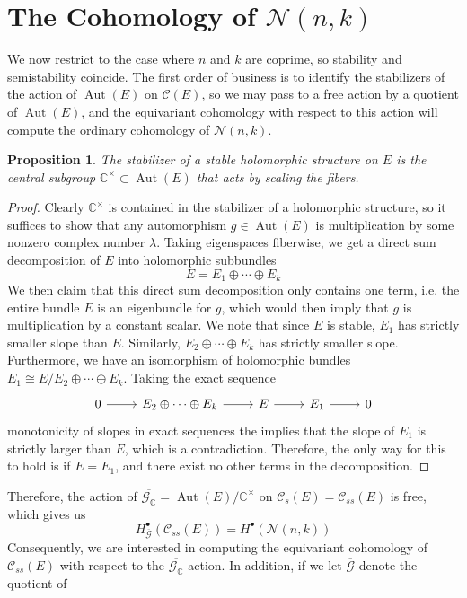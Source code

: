 \documentclass[psamsfonts, 12pt]{amsart}
\newtheorem{prop}[thm]{Proposition}
\theoremstyle{definition}
\theoremstyle{remark}
\newcommand{\C}{\mathbb{C}}
\DeclareMathOperator{\Aut}{Aut}
\begin{document}
\section{The Cohomology of $\mathcal{N}(n,k)$}
%
We now restrict to the case where $n$ and $k$ are coprime, so stability
and semistability coincide. The first order of business is to identify the
stabilizers of the action of $\Aut(E)$ on $\mathscr{C}(E)$, so we may pass to a
free action by a quotient of $\Aut(E)$, and the equivariant cohomology with
respect to this action will compute the ordinary cohomology of $\mathcal{N}(n,k)$.
%
\begin{prop}
The stabilizer of a stable holomorphic structure on $E$ is the central subgroup
$\C^\times \subset \Aut(E)$ that acts by scaling the fibers.
\end{prop}
%
\begin{proof}
Clearly $\C^\times$ is contained in the stabilizer of a holomorphic structure, so it
suffices to show that any automorphism $g \in \Aut(E)$ is multiplication by some
nonzero complex number $\lambda$. Taking eigenspaces fiberwise, we get a
direct sum decomposition of $E$ into holomorphic subbundles
\[
E = E_1 \oplus \cdots \oplus E_k
\]
We then claim that this direct sum decomposition only contains one term, i.e.
the entire bundle $E$ is an eigenbundle for $g$, which would then imply that
$g$ is multiplication by a constant scalar. We note that since $E$ is stable, $E_1$ has
strictly smaller slope than $E$. Similarly, $E_2\oplus\cdots\oplus E_k$ has strictly
smaller slope. Furthermore, we have an isomorphism of holomorphic
bundles $E_1 \cong E/E_2 \oplus\cdots\oplus E_k$. Taking the exact sequence
\[\begin{tikzcd}
0 \ar[r] & E_2\oplus\cdots\oplus E_k \ar[r] & E \ar[r] & E_1 \ar[r] & 0
\end{tikzcd}\]
monotonicity of slopes in exact sequences the implies that the slope of $E_1$
is strictly larger than $E$, which is a contradiction. Therefore, the only way
for this to hold is if $E = E_1$, and there exist no other terms in the
decomposition.
\end{proof}
%
Therefore, the action of $\overline{\mathscr{G}_\C} = \Aut(E)/\C^\times$ on
$\mathscr{C}_s(E) = \mathscr{C}_{ss}(E)$ is free, which gives us
\[
H^\bullet_{\overline{\mathscr{G}}}(\mathscr{C}_{ss}(E)) = H^\bullet(\mathcal{N}(n,k))
\]
Consequently, we are interested in computing the equivariant cohomology of
$\mathscr{C}_{ss}(E)$ with respect to the $\overline{\mathscr{G_\C}}$ action.
In addition, if we let $\overline{\mathscr{G}}$ denote the quotient of
\end{document}
